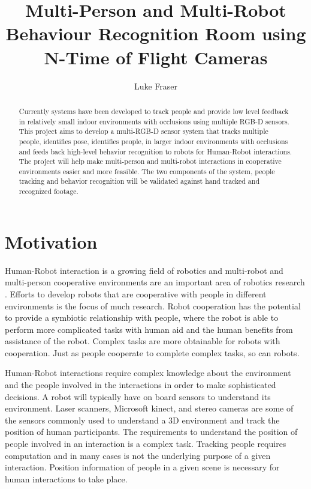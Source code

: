 \documentclass[12pt,a4paper]{article}
\author{Luke Fraser}
\title{Multi-Person and Multi-Robot Behaviour Recognition Room using N-Time of Flight Cameras}
\begin{document}
\maketitle
\begin{abstract}
Currently systems have been developed to track people and provide low level feedback in relatively small indoor environments with occlusions using multiple RGB-D sensors. This project aims to develop a multi-RGB-D sensor system that tracks multiple people, identifies pose, identifies people, in larger indoor environments with occlusions and feeds back high-level behavior recognition to robots for Human-Robot interactions. The project will help make multi-person and multi-robot interactions in cooperative environments easier and more feasible. The two components of the system, people tracking and behavior recognition will be validated against hand tracked and recognized footage.
\end{abstract}

\section{Motivation}
Human-Robot interaction is a growing field of robotics and multi-robot and multi-person cooperative environments are an important area of robotics research \cite{5928680, Schultz:2005:TCR:1052438.1052456}. Efforts to develop robots that are cooperative with people in different environments is the focus of much research. Robot cooperation has the potential to provide a symbiotic relationship with people, where the robot is able to perform more complicated tasks with human aid and the human benefits from assistance of the robot. Complex tasks are more obtainable for robots with cooperation\cite{6631192}. Just as people cooperate to complete complex tasks, so can robots.

Human-Robot interactions require complex knowledge about the environment and the people involved in the interactions in order to make sophisticated decisions. A robot will typically have on board sensors to understand its environment. Laser scanners, Microsoft kinect, and stereo cameras are some of the sensors commonly used to understand a 3D environment and track the position of human participants. The requirements to understand the position of people involved in an interaction is a complex task. Tracking people requires computation and in many cases is not the underlying purpose of a given interaction. Position information of people in a given scene is necessary for human interactions to take place.
\end{document}
